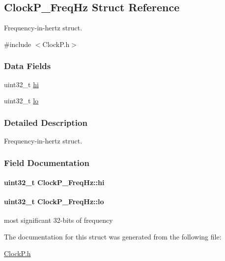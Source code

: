 \subsection{Clock\+P\+\_\+\+Freq\+Hz Struct Reference}
\label{struct_clock_p___freq_hz}


Frequency-\/in-\/hertz struct.  




{\ttfamily \#include $<$Clock\+P.\+h$>$}

\subsubsection*{Data Fields}
\begin{DoxyCompactItemize}
\item 
uint32\+\_\+t \hyperlink{struct_clock_p___freq_hz_aa904c480d9146b303386e6ec82c3987e}{hi}
\item 
uint32\+\_\+t \hyperlink{struct_clock_p___freq_hz_ab41efab05aa64017e11ed5c4231b165a}{lo}
\end{DoxyCompactItemize}


\subsubsection{Detailed Description}
Frequency-\/in-\/hertz struct. 

\subsubsection{Field Documentation}
\paragraph[{hi}]{\setlength{\rightskip}{0pt plus 5cm}uint32\+\_\+t Clock\+P\+\_\+\+Freq\+Hz\+::hi}\label{struct_clock_p___freq_hz_aa904c480d9146b303386e6ec82c3987e}
\paragraph[{lo}]{\setlength{\rightskip}{0pt plus 5cm}uint32\+\_\+t Clock\+P\+\_\+\+Freq\+Hz\+::lo}\label{struct_clock_p___freq_hz_ab41efab05aa64017e11ed5c4231b165a}
most significant 32-\/bits of frequency 

The documentation for this struct was generated from the following file\+:\begin{DoxyCompactItemize}
\item 
\hyperlink{_clock_p_8h}{Clock\+P.\+h}\end{DoxyCompactItemize}
